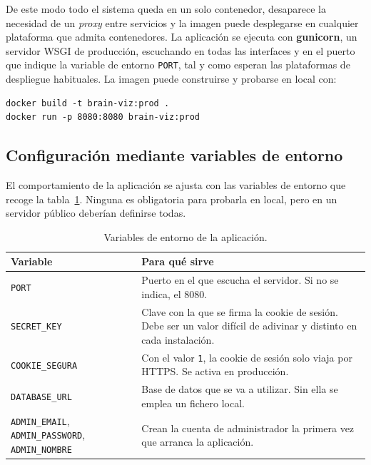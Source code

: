 De este modo todo el sistema queda en un solo contenedor, desaparece la necesidad de un \textit{proxy}
entre servicios y la imagen puede desplegarse en cualquier plataforma que admita contenedores. La
aplicación se ejecuta con \textbf{gunicorn}, un servidor WSGI de producción, escuchando en todas las
interfaces y en el puerto que indique la variable de entorno \texttt{PORT}, tal y como esperan las
plataformas de despliegue habituales. La imagen puede construirse y probarse en local con:

\begin{verbatim}
docker build -t brain-viz:prod .
docker run -p 8080:8080 brain-viz:prod
\end{verbatim}

\subsection{Configuración mediante variables de entorno}

El comportamiento de la aplicación se ajusta con las variables de entorno que recoge la
tabla~\ref{tab:variables}. Ninguna es obligatoria para probarla en local, pero en un servidor
público deberían definirse todas.

\begin{table}[H]
	\centering
	\caption{Variables de entorno de la aplicación.}
	\label{tab:variables}
	\small
	\begin{tabularx}{\textwidth}{>{\raggedright\arraybackslash}p{4.1cm} >{\raggedright\arraybackslash}X}
		\toprule
		\textbf{Variable} & \textbf{Para qué sirve} \\
		\midrule
		\texttt{PORT} & Puerto en el que escucha el servidor. Si no se indica, el 8080. \\
		\addlinespace
		\texttt{SECRET\_KEY} & Clave con la que se firma la cookie de sesión. Debe ser un valor
			difícil de adivinar y distinto en cada instalación. \\
		\addlinespace
		\texttt{COOKIE\_SEGURA} & Con el valor \texttt{1}, la cookie de sesión solo viaja por
			HTTPS. Se activa en producción. \\
		\addlinespace
		\texttt{DATABASE\_URL} & Base de datos que se va a utilizar. Sin ella se emplea un fichero
			local. \\
		\addlinespace
		\texttt{ADMIN\_EMAIL}, \texttt{ADMIN\_PASSWORD}, \texttt{ADMIN\_NOMBRE} & Crean la cuenta
			de administrador la primera vez que arranca la aplicación. \\
		\bottomrule
	\end{tabularx}
\end{table}


